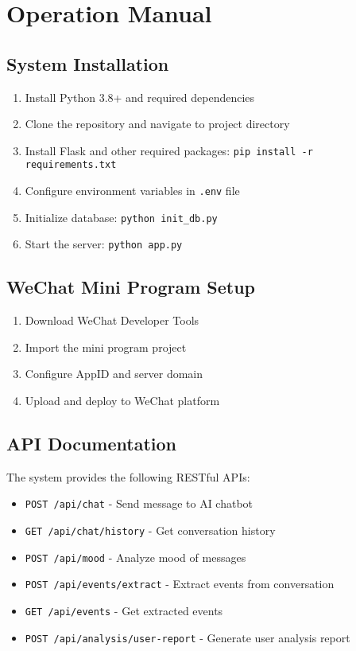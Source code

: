 \section{Operation Manual}
\label{sec:manual}

\subsection{System Installation}

\begin{enumerate}
    \item Install Python 3.8+ and required dependencies
    \item Clone the repository and navigate to project directory
    \item Install Flask and other required packages: \texttt{pip install -r requirements.txt}
    \item Configure environment variables in \texttt{.env} file
    \item Initialize database: \texttt{python init\_db.py}
    \item Start the server: \texttt{python app.py}
\end{enumerate}

\subsection{WeChat Mini Program Setup}

\begin{enumerate}
    \item Download WeChat Developer Tools
    \item Import the mini program project
    \item Configure AppID and server domain
    \item Upload and deploy to WeChat platform
\end{enumerate}

\subsection{API Documentation}

The system provides the following RESTful APIs:

\begin{itemize}
    \item \texttt{POST /api/chat} - Send message to AI chatbot
    \item \texttt{GET /api/chat/history} - Get conversation history
    \item \texttt{POST /api/mood} - Analyze mood of messages
    \item \texttt{POST /api/events/extract} - Extract events from conversation
    \item \texttt{GET /api/events} - Get extracted events
    \item \texttt{POST /api/analysis/user-report} - Generate user analysis report
\end{itemize}

